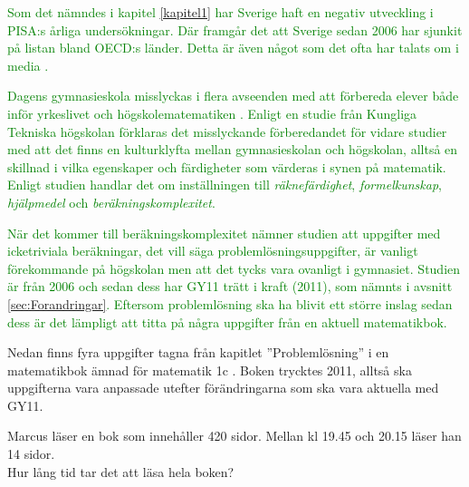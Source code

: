 
\textcolor{green}{Som det nämndes i kapitel \ref{kapitel1} har Sverige haft en negativ utveckling i PISA:s årliga undersökningar. Där framgår det att Sverige sedan 2006 har sjunkit på listan bland OECD:s länder. Detta är även något som det ofta har talats om i media \cite{pisaImedia}.}

\textcolor{green}{Dagens gymnasieskola misslyckas i flera avseenden med att förbereda elever både inför yrkeslivet \cite{TheElephant} och högskolematematiken \cite{spriddKunskap}. Enligt en studie från Kungliga Tekniska högskolan \cite{spriddKunskap} förklaras det misslyckande förberedandet för vidare studier med att det finns en kulturklyfta mellan gymnasieskolan och högskolan, alltså en skillnad i vilka egenskaper och färdigheter som värderas i synen på matematik. Enligt studien handlar det om inställningen till \textit{räknefärdighet}, \textit{formelkunskap}, \textit{hjälpmedel} och \textit{beräkningskomplexitet}.}

\textcolor{green}{När det kommer till beräkningskomplexitet nämner studien att uppgifter med icketriviala beräkningar, det vill säga problemlösningsuppgifter, är vanligt förekommande på högskolan men att det tycks vara ovanligt i gymnasiet.}
\textcolor{green}{Studien är från 2006 och sedan dess har GY11 trätt i kraft (2011), som nämnts i avsnitt \ref{sec:Forandringar}. Eftersom problemlösning ska ha blivit ett större inslag sedan dess är det lämpligt att titta på några uppgifter från en aktuell matematikbok.}

\textcolor{WildStrawberry}{
    Nedan finns fyra uppgifter tagna från kapitlet ''Problemlösning'' i en matematikbok ämnad för matematik 1c \cite{matte5000}. Boken trycktes 2011, alltså ska uppgifterna vara anpassade utefter förändringarna som ska vara aktuella med GY11.}



\begin{displayquote}
\textcolor{turkos}{Marcus läser en bok som innehåller 420 sidor. Mellan kl 19.45 och 20.15 läser han 14 sidor. \\
Hur lång tid tar det att läsa hela boken?}
\end{displayquote}

